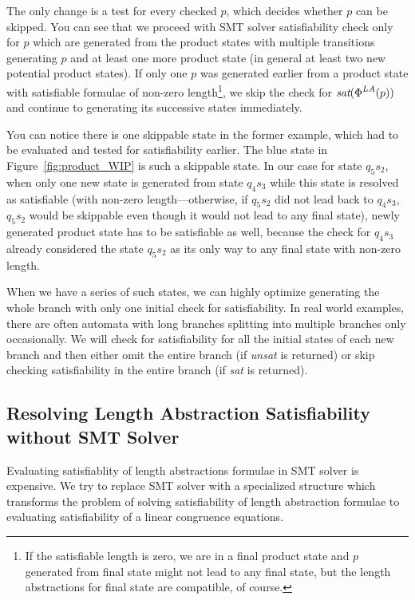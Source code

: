 The only change is a test for every checked $p$, which decides whether $p$ can be skipped. You can see that we proceed with SMT solver satisfiability check only for $p$ which are generated from the product states with multiple transitions generating $p$ and at least one more product state (in general at least two new potential product states). If only one $p$ was generated earlier from a product state with satisfiable formulae of non-zero length\footnote{If the satisfiable length is zero, we are in a final product state and $p$ generated from final state might not lead to any final state, but the length abstractions for final state are compatible, of course.}, we skip the check for $\emph{sat}(\emph{$\Phi$}^{LA}(p))$ and continue to generating its successive states immediately.

You can notice there is one skippable state in the former example, which had to be evaluated and tested for satisfiability earlier. The blue state in Figure~\ref{fig:product_WIP} is such a skippable state. In our case for state $q_5s_2$, when only one new state is generated from state $q_4s_3$ while this state is resolved as satisfiable (with non-zero length---otherwise, if $q_5s_2$ did not lead back to $q_4s_3$, $q_5s_2$ would be skippable even though it would not lead to any final state), newly generated product state has to be satisfiable as well, because the check for $q_4s_3$ already considered the state $q_5s_2$ as its only way to any final state with non-zero length.

When we have a series of such states, we can highly optimize generating the whole branch with only one initial check for satisfiability. In real world examples, there are often automata with long branches splitting into multiple branches only occasionally. We will check for satisfiability for all the initial states of each new branch and then either omit the entire branch (if \emph{unsat} is returned) or skip checking satisfiability in the entire branch (if \emph{sat} is returned).

\subsection{Resolving Length Abstraction Satisfiability without SMT Solver}

Evaluating satisfiablity of length abstractions formulae in SMT solver is expensive. We try to replace SMT solver with a specialized structure which transforms the problem of solving satisfiability of length abstraction formulae to evaluating satisfiability of a linear congruence equations.

